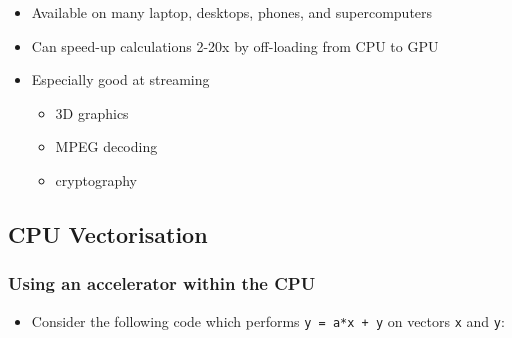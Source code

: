 \begin{itemize}
\itemsep1pt\parskip0pt
\item
  Available on many laptop, desktops, phones, and supercomputers
\item
  Can speed-up calculations 2-20x by off-loading from CPU to GPU
\item
  Especially good at streaming

  \begin{itemize}
  \itemsep1pt\parskip0pt
  \item
    3D graphics
  \item
    MPEG decoding
  \item
    cryptography
  \end{itemize}
\end{itemize}

\subsection{CPU Vectorisation}\label{cpu-vectorisation}

\subsubsection{Using an accelerator within the
CPU}\label{using-an-accelerator-within-the-cpu}

\begin{itemize}
\itemsep1pt\parskip0pt
\item
  Consider the following code which performs \texttt{y = a*x + y} on
  vectors \texttt{x} and \texttt{y}:
\end{itemize}

\begin{Shaded}
\begin{Highlighting}[]

      
            
     \NormalTok{)}
         \NormalTok{;}

     \NormalTok{(} 

     \NormalTok{;}
\NormalTok{\}}
\end{Highlighting}
\end{Shaded}

